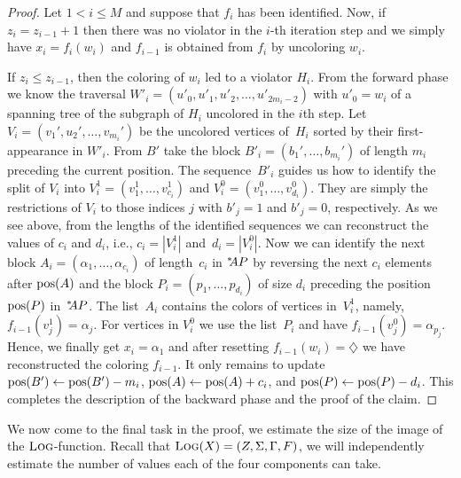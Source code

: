 \begin{proof}
  Let $1<i\leq M$ and suppose that $f_i$ has been identified.
  Now, if $z_{i} = z_{i-1} +1$ then 
  there was no violator in the $i$-th iteration step and we simply have 
  $x_i = f_i(w_i)$ and $f_{i-1}$ is obtained from $f_i$ by uncoloring $w_i$.
  

  If $z_i \leq z_{i-1}$, then the coloring of $w_i$ led to a violator
  $H_i$.  From the forward phase we know the traversal
  $W'_i=(u'_0,u'_1,u'_2,\ldots,u'_{2m_i-2})$ with $u'_0=w_i$ of a
  spanning tree of the subgraph of $H_i$ uncolored in the $i$th
  step. Let $V_i=(v_1',u_2',\ldots,v_{m_i}')$ be the uncolored vertices of~$H_i$
  sorted by their first-appearance in $W'_i$.  From $B'$ take the
  block $B'_i=(b_1',\ldots,b_{m_i}')$ of length $m_i$ preceding the
  current position.  The sequence~$B'_i$ guides us how to identify the
  split of $V_i$ into $V_i^{1} = (v^1_1,\ldots,v^1_{c_i})$ and
  $V_i^{0} = (v^0_1,\ldots,v^0_{d_i})$.  They are simply the
  restrictions of $V_i$ to those indices $j$ with $b'_j=1$ and
  $b'_j=0$, respectively.  As we see above, from the lengths of the
  identified sequences we can reconstruct the values of $c_i$ and
  $d_i$, i.e., $c_i=|V_i^1|$ and~$d_i=|V_i^0|$.  Now we can identify
  the next block $A_i= (\alpha_1,\ldots,\alpha_{c_i})$ of length~$c_i$
  in ${}^{*}\kern-3pt AP$ by reversing the next $c_i$ elements after $\text{\rmfamily pos}(A)$ and
  the block $P_i=(p_1,\ldots,p_{d_i})$ of size $d_i$ preceding the
  position $\text{\rmfamily pos}(P)$ in~${}^{*}\kern-3pt AP$.  The list~$A_i$ contains the colors of
  vertices in~$V^1_i$, namely, $f_{i-1}(v^1_j) = \alpha_j$.  For
  vertices in $V_i^{0}$ we use the list~$P_i$ and have
  $f_{i-1}(v^0_j) = \alpha_{p_{j}}$.  Hence, we finally get
  $x_i=\alpha_1$ and after resetting $f_{i-1}(w_i)=\diamondsuit$ we have
  reconstructed the coloring $f_{i-1}$.  It only remains to update
  $\text{\rmfamily pos}(B') \gets \text{\rmfamily pos}(B')-m_i$, $\text{\rmfamily pos}(A) \gets \text{\rmfamily pos}(A)+c_i$, and
  $\text{\rmfamily pos}(P) \gets \text{\rmfamily pos}(P)-d_i$.  This completes the description of the
  backward phase and the proof of the claim.
\end{proof}

We now come to the final task in the proof, we estimate the
size of the image of the $\text{\scshape Log}$-function.
Recall that $\text{\scshape Log}(X) = (Z,\Sigma,\Gamma,F)$, we will independently
estimate the number of values each of the four components can take.

